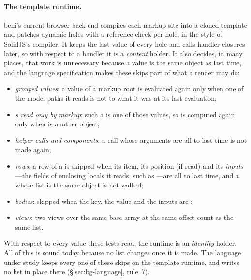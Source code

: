 \paragraph{The template runtime.} beni's current browser back end compiles each markup site into a
cloned template and patches dynamic holes with a reference check per hole, in the style of
SolidJS's compiler. It keeps the last value of every hole and calls handler closures later, so with
respect to a handler it is a \emph{content} holder. It also decides, in many places, that work is
unnecessary because a value is the same object as last time, and the language specification makes
these skips part of what a render may do:
\begin{itemize}
\item \emph{grouped values}: a value of a markup root is evaluated again only when one of the model
paths it reads is not \code{===} to what it was at its last evaluation;
\item \emph{s read only by markup}: such a  is one of those values, so
 is computed again only when  is another object;
\item \emph{helper calls and components}: a call whose arguments are all \code{===} to last time is
not made again;
\item \emph{rows}: a row of a  is skipped when its item, its position (if read) and its
\emph{inputs}---the fields of enclosing locals it reads, such as ---are all
\code{===} to last time, and a  whose list is the same object is not walked;
\item \emph{ bodies}: skipped when the key, the value and the inputs are \code{===};
\item \emph{views}: two views over the same base array at the same offset count as the same list.
\end{itemize}
With respect to every value these tests read, the runtime is an \emph{identity} holder. All of this
is sound today because no list changes once it is made. The language under study keeps every one of
these skips on the template runtime, and writes no list in place there (\S\ref{sec:bg-language},
rule~7).


